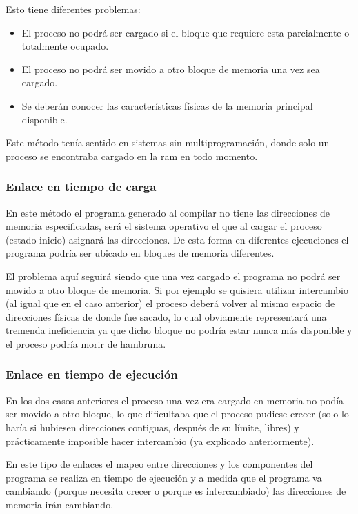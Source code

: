 Esto tiene diferentes problemas:
\begin{itemize}
	\item El proceso no podrá ser cargado si el bloque que requiere esta
parcialmente o totalmente ocupado.
	\item El proceso no podrá ser movido a otro bloque de memoria una vez
sea cargado.
	\item Se deberán conocer las características físicas de la memoria
principal disponible.
\end{itemize}

Este método tenía sentido en sistemas sin multiprogramación, donde solo un
proceso se encontraba cargado en la ram en todo momento.

\subsubsection{Enlace en tiempo de carga}
En este método el programa generado al compilar no tiene las direcciones de
memoria especificadas, será el sistema operativo el que al cargar el proceso
(estado inicio) asignará las direcciones. De esta forma en diferentes
ejecuciones el programa podría ser ubicado en bloques de memoria diferentes.

El problema aquí seguirá siendo que una vez cargado el programa no podrá ser
movido a otro bloque de memoria. Si por ejemplo se quisiera utilizar intercambio
(al igual que en el caso anterior) el proceso deberá volver al mismo espacio de
direcciones físicas de donde fue sacado, lo cual obviamente representará una
tremenda ineficiencia ya que dicho bloque no podría estar nunca más disponible y
el proceso podría morir de hambruna.

\subsubsection{Enlace en tiempo de ejecución}
En los dos casos anteriores el proceso una vez era cargado en memoria no podía
ser movido a otro bloque, lo que dificultaba que el proceso pudiese crecer (solo
lo haría si hubiesen direcciones contiguas, después de su límite, libres) y
prácticamente imposible hacer intercambio (ya explicado anteriormente).

En este tipo de enlaces el mapeo entre direcciones y los componentes del
programa se realiza en tiempo de ejecución y a medida que el programa va
cambiando (porque necesita crecer o porque es intercambiado) las direcciones de
memoria irán cambiando.

